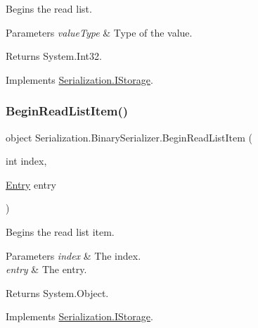 Begins the read list. 


\begin{DoxyParams}{Parameters}
{\em value\+Type} & Type of the value.\\
\hline
\end{DoxyParams}
\begin{DoxyReturn}{Returns}
System.\+Int32.
\end{DoxyReturn}


Implements \hyperlink{interface_serialization_1_1_i_storage_afe6be681d819bbfd7db4078f29230020}{Serialization.\+I\+Storage}.

\mbox{\label{class_serialization_1_1_binary_serializer_a8d689325716bdb8c393e16414fefd59f}} 
\subsubsection{\texorpdfstring{Begin\+Read\+List\+Item()}{BeginReadListItem()}}
{\footnotesize\ttfamily object Serialization.\+Binary\+Serializer.\+Begin\+Read\+List\+Item (\begin{DoxyParamCaption}\item[{int}]{index,  }\item[{\hyperlink{class_serialization_1_1_entry}{Entry}}]{entry }\end{DoxyParamCaption})\hspace{0.3cm}{\ttfamily [inline]}}



Begins the read list item. 


\begin{DoxyParams}{Parameters}
{\em index} & The index.\\
\hline
{\em entry} & The entry.\\
\hline
\end{DoxyParams}
\begin{DoxyReturn}{Returns}
System.\+Object.
\end{DoxyReturn}


Implements \hyperlink{interface_serialization_1_1_i_storage_abfe338de53a6322dbd3832d426ae49a4}{Serialization.\+I\+Storage}.

\mbox{\label{class_serialization_1_1_binary_serializer_ac4d785eb39bba193195761ff9bacd98c}} 
